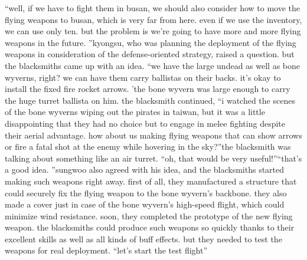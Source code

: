 “well, if we have to fight them in busan, we should also consider how to move the flying weapons to busan, which is very far from here.
 even if we use the inventory, we can use only ten.
 but the problem is we’re going to have more and more flying weapons in the future.
”kyongsu, who was planning the deployment of the flying weapons in consideration of the defense-oriented strategy, raised a question.
but the blacksmiths came up with an idea.
“we have the large undead as well as bone wyverns, right? we can have them carry ballistas on their backs.
 it’s okay to install the fixed fire rocket arrows.
’the bone wyvern was large enough to carry the huge turret ballista on him.
the blacksmith continued, “i watched the scenes of the bone wyverns wiping out the pirates in taiwan, but it was a little disappointing that they had no choice but to engage in melee fighting despite their aerial advantage.
 how about us making flying weapons that can show arrows or fire a fatal shot at the enemy while hovering in the sky?”the blacksmith was talking about something like an air turret.
“oh, that would be very useful!”“that’s a good idea.
”sungwoo also agreed with his idea, and the blacksmiths started making such weapons right away.
first of all, they manufactured a structure that could securely fix the flying weapon to the bone wyvern’s backbone.
 they also made a cover just in case of the bone wyvern’s high-speed flight, which could minimize wind resistance.
soon, they completed the prototype of the new flying weapon.
 the blacksmiths could produce such weapons so quickly thanks to their excellent skills as well as all kinds of buff effects.
but they needed to test the weapons for real deployment.
“let’s start the test flight”

 